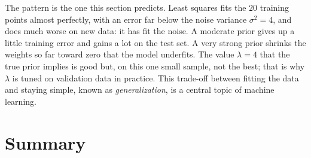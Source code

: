 The pattern is the one this section predicts. Least squares fits the
$20$ training points almost perfectly, with an error far below the noise
variance $\sigma^2 = 4$, and does much worse on new data: it has fit the
noise. A moderate prior gives up a little training error and gains a lot
on the test set. A very strong prior shrinks the weights so far toward
zero that the model underfits. The value $\lambda = 4$ that the true
prior implies is good but, on this one small sample, not the best; that
is why $\lambda$ is tuned on validation data in practice.
This trade-off between fitting the data and staying simple, known as
\emph{generalization}, is a central topic of machine learning.

\section{Summary}
\label{sec:ch06-summary}

